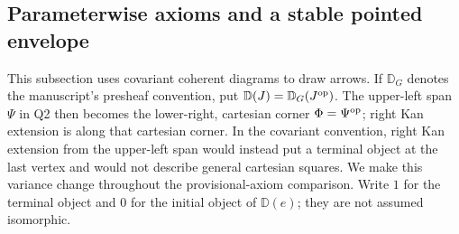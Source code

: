 \subsection{Parameterwise axioms and a stable pointed envelope}
\label{sec:A2-review}
This subsection uses covariant coherent diagrams to draw arrows. If
$\mathbb D_G$ denotes the manuscript's presheaf convention, put
$\mathbb D(J)=\mathbb D_G(J^{\mathrm{op}})$. The upper-left span $\Psi$ in Q2
then becomes the lower-right, cartesian corner $\Phi=\Psi^{\mathrm{op}}$; right
Kan extension is along that cartesian corner. In the covariant convention,
right Kan extension from the upper-left span would instead put a terminal
object at the last vertex and would not describe general cartesian squares.
We make this variance change throughout the provisional-axiom comparison.
Write $1$ for the terminal object and $0$ for the initial object of
$\mathbb D(e)$; they are not assumed isomorphic.

